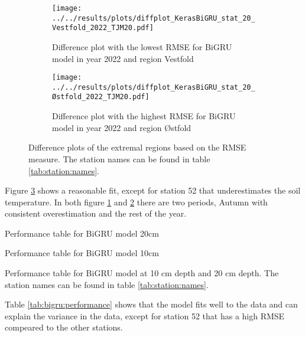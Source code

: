 \begin{figure}[H]
	\begin{subfigure}{0.45\textwidth}
		\centering
		\texttt{[image: ../../results/plots/diffplot\_KerasBiGRU\_stat\_20\_Vestfold\_2022\_TJM20.pdf]}
		\caption[Lowest RMSE Difference plot of BiGRU model]{Difference plot with the lowest RMSE for BiGRU model in year 2022 and region Vestfold}
		\label{fig:bigru:diff:best}
	\end{subfigure}
	\hfill
	\begin{subfigure}{0.45\textwidth}
		\centering
		\texttt{[image: ../../results/plots/diffplot\_KerasBiGRU\_stat\_20\_Østfold\_2022\_TJM20.pdf]}
		\caption[Highest RMSE Difference plot of BiGRU model]{Difference plot with the highest RMSE for BiGRU model in year 2022 and region Østfold}
		\label{fig:bigru:diff:worst}
	\end{subfigure}
		\caption[Difference plots of extremal regions BiGRU]{Difference plots of the extremal regions based on the RMSE measure. The station names can be found in table \ref{tab:station:names}.}
		\label{fig:bigru:diff:bestworst}
\end{figure}

Figure \ref{fig:bigru:diff:bestworst} shows a reasonable fit, except for station 52 that underestimates the soil temperature. In both figure \ref{fig:bigru:diff:best} and \ref{fig:bigru:diff:worst} there are two periods, Autumn with consistent overestimation and the rest of the year.

\begin{table}
	\begin{subtable}{0.8\textwidth}
		
		\caption{Performance table for BiGRU model 20cm}
	\end{subtable}
	\begin{subtable}{0.8\textwidth}
		
		\caption{Performance table for BiGRU model 10cm}
	\end{subtable}
	\caption{Performance table for BiGRU model at 10 cm depth and 20 cm depth. The station names can be found in table \ref{tab:station:names}.}
	\label{tab:bigru:performance}
\end{table}

Table \ref{tab:bigru:performance} shows that the model fits well to the data and can explain the variance in the data, except for station 52 that has a high RMSE compeared to the other stations.

